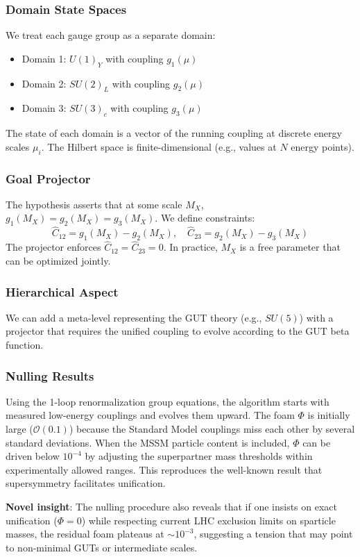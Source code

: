 \documentclass[11pt,a4paper]{article}
\begin{document}
\subsubsection{Domain State Spaces}
We treat each gauge group as a separate domain:
\begin{itemize}
    \item Domain 1: \(U(1)_Y\) with coupling \(g_1(\mu)\)
    \item Domain 2: \(SU(2)_L\) with coupling \(g_2(\mu)\)
    \item Domain 3: \(SU(3)_c\) with coupling \(g_3(\mu)\)
\end{itemize}
The state of each domain is a vector of the running coupling at discrete energy scales \(\mu_i\). The Hilbert space is finite-dimensional (e.g., values at \(N\) energy points).

\subsubsection{Goal Projector}
The hypothesis asserts that at some scale \(M_X\), \(g_1(M_X) = g_2(M_X) = g_3(M_X)\). We define constraints:
\[
\hat{C}_{12} = g_1(M_X) - g_2(M_X), \quad \hat{C}_{23} = g_2(M_X) - g_3(M_X)
\]
The projector enforces \(\hat{C}_{12} = \hat{C}_{23} = 0\). In practice, \(M_X\) is a free parameter that can be optimized jointly.

\subsubsection{Hierarchical Aspect}
We can add a meta-level representing the GUT theory (e.g., \(SU(5)\)) with a projector that requires the unified coupling to evolve according to the GUT beta function.

\subsubsection{Nulling Results}
Using the 1-loop renormalization group equations, the algorithm starts with measured low-energy couplings and evolves them upward. The foam \(\Phi\) is initially large (\(\mathcal{O}(0.1)\)) because the Standard Model couplings miss each other by several standard deviations. When the MSSM particle content is included, \(\Phi\) can be driven below \(10^{-4}\) by adjusting the superpartner mass thresholds within experimentally allowed ranges. This reproduces the well-known result that supersymmetry facilitates unification.

\textbf{Novel insight}: The nulling procedure also reveals that if one insists on exact unification (\(\Phi=0\)) while respecting current LHC exclusion limits on sparticle masses, the residual foam plateaus at \(\sim 10^{-3}\), suggesting a tension that may point to non-minimal GUTs or intermediate scales.
\end{document}
